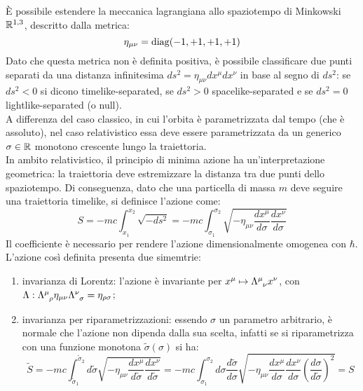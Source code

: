 È possibile estendere la meccanica lagrangiana allo spaziotempo di Minkowski $ \mathbb{R}^{1,3} $, descritto dalla metrica:
\begin{equation}
  \eta_{\mu \nu} = \operatorname{diag}(-1,+1,+1,+1)
  \label{eq:1.10}
\end{equation}
Dato che questa metrica non è definita positiva, è possibile classificare due punti separati da una distanza infinitesima $ ds^2 = \eta_{\mu \nu} dx^{\mu} dx^{\nu} $ in base al segno di $ ds^2 $: se $ ds^2 < 0 $ si dicono timelike-separated, se $ ds^2 > 0 $ spacelike-separated e se $ ds^2 = 0 $ lightlike-separated (o null).\\
A differenza del caso classico, in cui l'orbita è parametrizzata dal tempo (che è assoluto), nel caso relativistico essa deve essere parametrizzata da un generico $ \sigma \in \mathbb{R} $ monotono crescente lungo la traiettoria.\\
In ambito relativistico, il principio di minima azione ha un'interpretazione geometrica: la traiettoria deve estremizzare la distanza tra due punti dello spaziotempo. Di conseguenza, dato che una particella di massa $ m $ deve seguire una traiettoria timelike, si definisce l'azione come:
\begin{equation}
  S = -mc \int_{x_1}^{x_2} \sqrt{-ds^2} = -mc \int_{\sigma_1}^{\sigma_2} \sqrt{-\eta_{\mu \nu} \frac{dx^{\mu}}{d\sigma} \frac{dx^{\nu}}{d\sigma}}
  \label{eq:1.11}
\end{equation}
Il coefficiente è necessario per rendere l'azione dimensionalmente omogenea con $ \hbar $.\\
L'azione così definita presenta due simemtrie:
\begin{enumerate}
  \item invarianza di Lorentz: l'azione è invariante per $ x^{\mu} \mapsto \tensor{\Lambda}{^\mu_\nu} x^{\nu} $, con $ \Lambda : \tensor{\Lambda}{^\mu_\rho} \eta_{\mu \nu} \tensor{\Lambda}{^\nu_\sigma} = \eta_{\rho \sigma} $;
  \item invarianza per riparametrizzazioni: essendo $ \sigma $ un parametro arbitrario, è normale che l'azione non dipenda dalla sua scelta, infatti se si riparametrizza con una funzione monotona $ \tilde{\sigma}(\sigma) $ si ha:
    \begin{equation}
      \tilde{S} = -mc \int_{\tilde{\sigma}_1}^{\tilde{\sigma}_2} d\tilde{\sigma} \sqrt{- \eta_{\mu \nu} \frac{dx^{\mu}}{d\tilde{\sigma}} \frac{dx^{\nu}}{d\tilde{\sigma}}} = -mc \int_{\sigma_1}^{\sigma_2} d\sigma \frac{d\tilde{\sigma}}{d\sigma} \sqrt{- \eta_{\mu \nu} \frac{dx^{\mu}}{d\sigma} \frac{dx^{\nu}}{d\sigma} \left( \frac{d\sigma}{d\tilde{\sigma}} \right)^2} = S
      \label{eq:1.12}
    \end{equation}
\end{enumerate}

